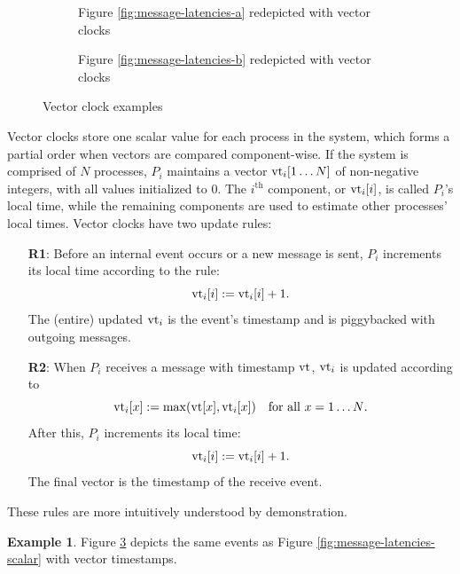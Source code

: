 \documentclass[]             %
{NASA}                       %
\theoremstyle{definition}
\newtheorem{example}[theorem]{Example}
\begin{document}
\begin{figure}
  \setlength\belowcaptionskip{5ex}

  \begin{subfigure}{1\textwidth}
    \centering
    
    \caption{Figure \ref{fig:message-latencies-a} redepicted with vector clocks}
    \label{fig:message-latencies-vector-a}
  \end{subfigure}

  \vspace{4ex}

  \begin{subfigure}{1\textwidth}
    \centering 
    \caption{Figure \ref{fig:message-latencies-b} redepicted with vector clocks}
    \label{fig:message-latencies-vector-b}
  \end{subfigure}

  \caption{Vector clock examples}
  \label{fig:message-latencies-vector}
\end{figure}
\afterpage{\clearpage}

Vector clocks store one scalar value for each process in the system,
which forms a partial order when vectors are compared
component-wise. If the system is comprised of $N$ processes, $P_i$
maintains a vector $\textrm{vt}_i[1 \ldots N]$ of non-negative integers, with
all values initialized to $0$. The $i^\textrm{th}$ component, or
$\textrm{vt}_i[i]$, is called $P_i$'s local time, while the remaining
components are used to estimate other processes' local times. Vector
clocks have two update rules:
\begin{enumerate}
\item[\textbf{R1}:] Before an internal event occurs or a new message is sent, $P_i$
  increments its local time according to the rule:
  \[\textrm{vt}_i[i] := \textrm{vt}_i[i] + 1.\]
  The (entire) updated $\textrm{vt}_i$ is the event's timestamp and is piggybacked with outgoing messages.
\item[\textbf{R2}:] When $P_i$ receives a message with timestamp
  $\textrm{vt}$, $\textrm{vt}_i$ is updated according to
  \[\textrm{vt}_i[x] := \max(\textrm{vt}[x], \textrm{vt}_i[x]) \quad \textrm{for all $x = 1\ldots N$}.\]
  After this, $P_i$ increments its local time:
  \[ \textrm{vt}_i[i] := \textrm{vt}_i[i] + 1.\]
  The final vector is the timestamp of the receive event.
\end{enumerate}
These rules are more intuitively understood by demonstration.

\begin{example}
  Figure \ref{fig:message-latencies-vector} depicts the same events as
  Figure \ref{fig:message-latencies-scalar} with vector timestamps.
\end{example}
\end{document}
